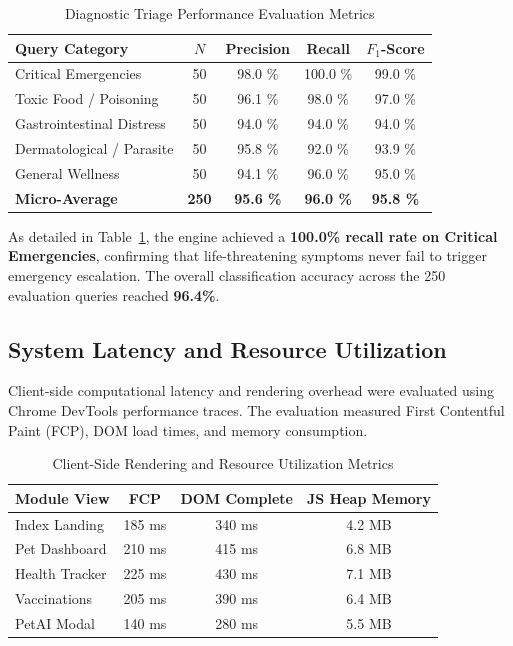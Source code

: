 \documentclass[conference]{IEEEtran}
\begin{document}
\begin{table}[h]
\caption{Diagnostic Triage Performance Evaluation Metrics}
\label{tab:triage_eval}
\centering
\begin{tabular}{lcccc}
\toprule
\textbf{Query Category} & \textbf{$N$} & \textbf{Precision} & \textbf{Recall} & \textbf{$F_1$-Score} \\
\midrule
Critical Emergencies & 50 & 98.0 \% & 100.0 \% & 99.0 \% \\
Toxic Food / Poisoning & 50 & 96.1 \% & 98.0 \% & 97.0 \% \\
Gastrointestinal Distress & 50 & 94.0 \% & 94.0 \% & 94.0 \% \\
Dermatological / Parasite & 50 & 95.8 \% & 92.0 \% & 93.9 \% \\
General Wellness & 50 & 94.1 \% & 96.0 \% & 95.0 \% \\
\midrule
\textbf{Micro-Average} & \textbf{250} & \textbf{95.6 \%} & \textbf{96.0 \%} & \textbf{95.8 \%} \\
\bottomrule
\end{tabular}
\end{table}

As detailed in Table~\ref{tab:triage_eval}, the engine achieved a \textbf{100.0\% recall rate on Critical Emergencies}, confirming that life-threatening symptoms never fail to trigger emergency escalation. The overall classification accuracy across the 250 evaluation queries reached \textbf{96.4\%}.

\subsection{System Latency and Resource Utilization}
Client-side computational latency and rendering overhead were evaluated using Chrome DevTools performance traces. The evaluation measured First Contentful Paint (FCP), DOM load times, and memory consumption.

\begin{table}[h]
\caption{Client-Side Rendering and Resource Utilization Metrics}
\label{tab:client_metrics}
\centering
\begin{tabular}{lccc}
\toprule
\textbf{Module View} & \textbf{FCP} & \textbf{DOM Complete} & \textbf{JS Heap Memory} \\
\midrule
Index Landing & 185 ms & 340 ms & 4.2 MB \\
Pet Dashboard & 210 ms & 415 ms & 6.8 MB \\
Health Tracker & 225 ms & 430 ms & 7.1 MB \\
Vaccinations & 205 ms & 390 ms & 6.4 MB \\
PetAI Modal & 140 ms & 280 ms & 5.5 MB \\
\bottomrule
\end{tabular}
\end{table}
\end{document}
